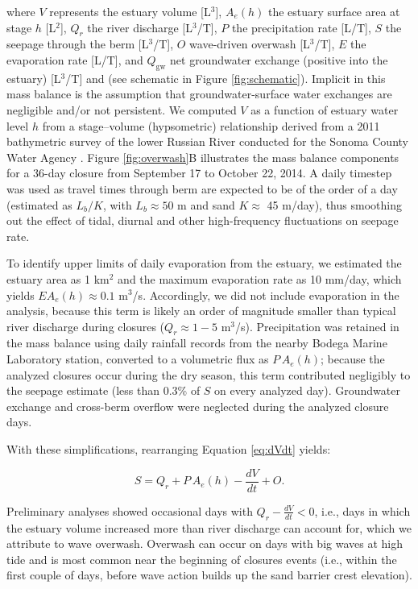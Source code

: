 \documentclass[preprint,12pt,authoryear]{elsarticle}
\begin{document}
\noindent  where $V$  represents the estuary volume [L$^3$],
$A_e(h)$   the estuary surface area at stage $h$ [L$^2$],
$Q_r$ the river discharge [L$^3$/T],
$P$ the precipitation rate [L/T],
$S$ the seepage through the berm [L$^3$/T],
$O$ wave-driven overwash [L$^3$/T],
$E$  the evaporation rate [L/T], and
$Q_{\mathrm{gw}}$ net groundwater exchange (positive into the estuary) [L$^3$/T]
and %
(see schematic in Figure \ref{fig:schematic}).
Implicit in this mass balance is the assumption that groundwater-surface water exchanges are negligible and/or not persistent.
We computed $V$ as a function of estuary water level $h$ from a stage--volume (hypsometric) relationship derived from a 2011 bathymetric survey of the lower Russian River conducted for the Sonoma County Water Agency \citep{EDS_2011_LowerRussianRiver_Bathy}.
Figure \ref{fig:overwash}B illustrates the mass balance components for a 36-day closure from September 17 to October 22, 2014.
A daily timestep was used as travel times through berm are expected to be of the order of a day (estimated as $L_b/K$, with $L_b \approx 50$ m and sand $K \approx$ 45 m/day), thus smoothing out the effect of tidal, diurnal and other high-frequency fluctuations on seepage rate.

To identify upper limits of daily evaporation from the estuary, we estimated the estuary area as 1 km$^2$ and the maximum  evaporation rate as 10 mm/day, which yields $E A_e(h) \approx 0.1$ m$^3$/s. Accordingly, we did not include evaporation in the analysis, because this term is likely an order of magnitude smaller than typical river discharge during closures ($Q_r \approx 1-5$ m$^3$/s).  Precipitation was retained in the mass balance using daily rainfall records from the nearby Bodega Marine Laboratory station, converted to a volumetric flux as $P\,A_e(h)$; because the analyzed closures occur during the dry season, this term contributed negligibly to the seepage estimate (less than 0.3\% of $S$ on every analyzed day). Groundwater exchange and cross-berm overflow were neglected during the analyzed closure days.

With these simplifications, rearranging Equation \ref{eq:dVdt} yields:

\begin{equation}
\label{eq:S}
    S  = Q_r + P\,A_e(h) - \frac{dV}{ dt} + O.
\end{equation}

Preliminary analyses showed occasional days with  $Q_r - \frac{dV}{ dt} <0$, i.e., days in which the estuary volume increased more than river discharge can account for, which we attribute to wave overwash. Overwash can occur on days with big waves at high tide and is most common near the beginning of closures events (i.e., within the first couple of days, before wave action builds up the sand barrier crest elevation).
\end{document}
